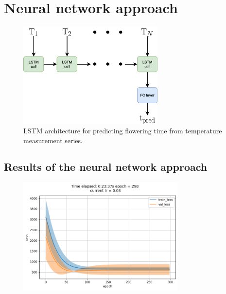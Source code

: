 \documentclass[11pt, a4paper]{article}
\begin{document}
\newpage
\section*{Neural network approach}
\begin{figure}[H]
    \centering
    \includegraphics[width=0.65\textwidth]{images/LSTM_arch.png}
    \caption{LSTM architecture for predicting flowering time from temperature measurement series.}
\end{figure}

\subsection*{Results of the neural network approach}
\begin{figure}[H]
    \centering
    \includegraphics[width=0.75\textwidth]{images/loss-6.png}
\end{figure}
\end{document}
